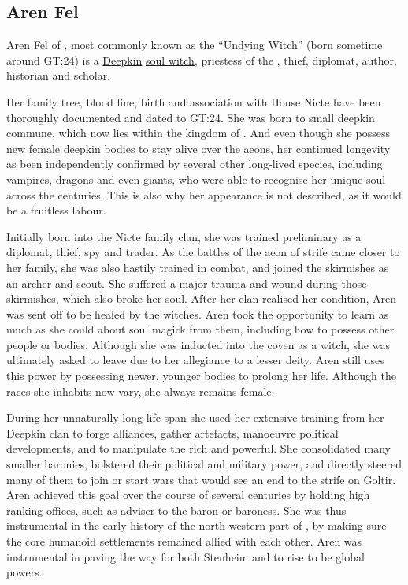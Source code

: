 \subsection{Aren Fel}
\label{sec:Aren Fel}

Aren Fel of , most commonly known as the ``Undying Witch''
(born sometime around GT:24) is a \hyperref[sec:Deepkin]{Deepkin}
\hyperref[sec:Soul Magic]{soul witch}, priestess of the , thief, diplomat, author, historian and scholar.

Her family tree, blood line, birth and association with House Nicte have been
thoroughly documented and dated to GT:24. She was born to small deepkin
commune, which now lies within the kingdom of . And even
though she possess new female deepkin bodies to stay alive over the aeons, her
continued longevity as been independently confirmed by several other
long-lived species, including vampires, dragons and even giants, who were able
to recognise her unique soul across the centuries.  This is also why her
appearance is not described, as it would be a fruitless labour.

Initially born into the Nicte family clan, she was trained preliminary as a
diplomat, thief, spy and trader. As the battles of the aeon of strife came
closer to her family, she was also hastily trained in combat, and joined the
skirmishes as an archer and scout. She suffered a major trauma and wound during
those skirmishes, which also \hyperref[sec:Soul Awakening]{broke her soul}.
After her clan realised her condition, Aren was sent off to be healed by the
 witches. Aren took the opportunity to learn as much as
she could about soul magick from them, including how to possess other people
or bodies. Although she was inducted into the coven as a witch, she was
ultimately asked to leave due to her allegiance to a lesser deity. Aren still
uses this power by possessing newer, younger bodies to prolong her life.
Although the races she inhabits now vary, she always remains female.

During her unnaturally long life-span she used her extensive
training from her Deepkin clan to forge alliances, gather artefacts,
manoeuvre political developments, and to manipulate the rich and powerful.
She consolidated many smaller baronies, bolstered their political and military
power, and directly steered many of them to join or start wars that would see
an end to the strife on Goltir. Aren achieved this goal over the course of
several centuries by holding high ranking offices, such as adviser to the baron
or baroness. She was thus instrumental in the early history of the
north-western part of , by making sure the core humanoid
settlements remained allied with each other. Aren was instrumental in paving
the way for both Stenheim and  to rise to be global
powers.

